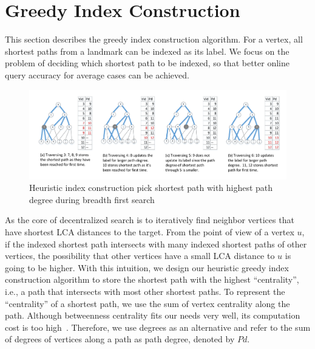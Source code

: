 \section{Greedy Index Construction}
\label{preprocessing}

This section describes the greedy index construction algorithm. For a vertex, all shortest paths from a landmark can be indexed as its label. We focus on the problem of deciding which shortest path to be indexed, so that better online query accuracy for average cases can be achieved. 

\begin{figure}[ht]
		\vspace{-1cm}
    \centering
    \includegraphics[width=\linewidth]{./figures/new_illustrate/bfs_illustrate.pdf}
		\vspace{-1cm}
    \caption{Heuristic index construction pick shortest path with highest path degree during breadth first search}
    \label{fig:bfs_illustrate}
		\vspace{-5mm}
\end{figure}

As the core of decentralized search is to iteratively find neighbor vertices that have shortest LCA distances to the target. From the point of view of a vertex $u$, if the indexed shortest path intersects with many indexed shortest paths of other vertices, the possibility that other vertices have a small LCA distance to $u$ is going to be higher. With this intuition, we design our heuristic greedy index construction algorithm to store the shortest path with the highest ``centrality'', i.e., a path that intersects with most other shortest paths. To represent the ``centrality'' of a shortest path, we use the sum of vertex centrality along the path. Although betweenness centrality fits our needs very well, its computation cost is too high~\cite{Riondato:2014:FAB:2556195.2556224}. Therefore, we use degrees as an alternative and refer to the sum of degrees of vertices along a path as path degree, denoted by $Pd$.

